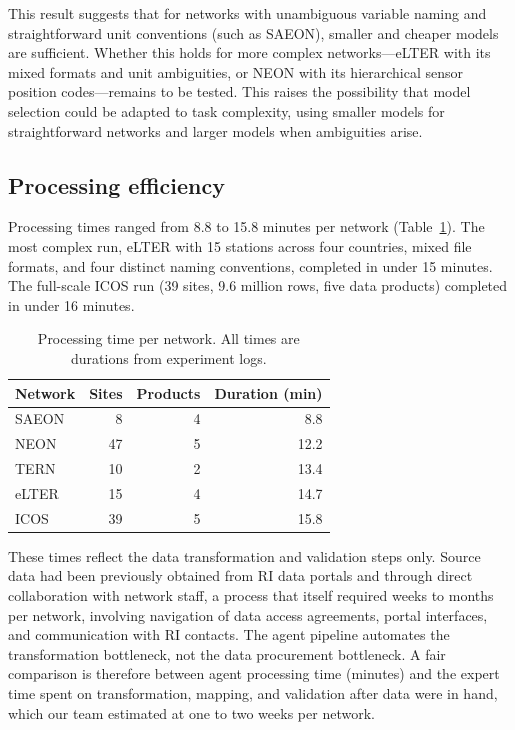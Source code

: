 \documentclass[review,authoryear]{elsarticle}
\begin{document}
This result suggests that for networks with unambiguous variable naming and straightforward unit conventions (such as SAEON), smaller and cheaper models are sufficient. Whether this holds for more complex networks---eLTER with its mixed formats and unit ambiguities, or NEON with its hierarchical sensor position codes---remains to be tested. This raises the possibility that model selection could be adapted to task complexity, using smaller models for straightforward networks and larger models when ambiguities arise.

\subsection{Processing efficiency}
\label{sec:efficiency}

Processing times ranged from 8.8 to 15.8 minutes per network (Table~\ref{tab:timing}). The most complex run, eLTER with 15 stations across four countries, mixed file formats, and four distinct naming conventions, completed in under 15 minutes. The full-scale ICOS run (39 sites, 9.6 million rows, five data products) completed in under 16 minutes.

\begin{table}[htbp]
\centering
\caption{Processing time per network. All times are durations from experiment logs.}
\label{tab:timing}
\small
\begin{tabular}{lrrr}
\toprule
Network & Sites & Products & Duration (min) \\
\midrule
SAEON & 8 & 4 & 8.8 \\
NEON & 47 & 5 & 12.2 \\
TERN & 10 & 2 & 13.4 \\
eLTER & 15 & 4 & 14.7 \\
ICOS & 39 & 5 & 15.8 \\
\bottomrule
\end{tabular}
\end{table}

These times reflect the data transformation and validation steps only. Source data had been previously obtained from RI data portals and through direct collaboration with network staff, a process that itself required weeks to months per network, involving navigation of data access agreements, portal interfaces, and communication with RI contacts. The agent pipeline automates the transformation bottleneck, not the data procurement bottleneck. A fair comparison is therefore between agent processing time (minutes) and the expert time spent on transformation, mapping, and validation after data were in hand, which our team estimated at one to two weeks per network.
\end{document}
